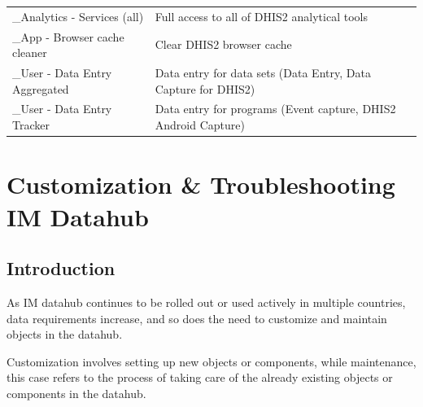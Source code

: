\documentclass[]{book}
\begin{document}
\begin{longtable}[]{@{}ll@{}}
\begin{minipage}[t]{0.27\columnwidth}\raggedright
\_Analytics - Services (all)\strut
\end{minipage} & \begin{minipage}[t]{0.67\columnwidth}\raggedright
Full access to all of DHIS2 analytical tools\strut
\end{minipage}\tabularnewline
\begin{minipage}[t]{0.27\columnwidth}\raggedright
\_App - Browser cache cleaner\strut
\end{minipage} & \begin{minipage}[t]{0.67\columnwidth}\raggedright
Clear DHIS2 browser cache\strut
\end{minipage}\tabularnewline
\begin{minipage}[t]{0.27\columnwidth}\raggedright
\_User - Data Entry Aggregated\strut
\end{minipage} & \begin{minipage}[t]{0.67\columnwidth}\raggedright
Data entry for data sets (Data Entry, Data Capture for DHIS2)\strut
\end{minipage}\tabularnewline
\begin{minipage}[t]{0.27\columnwidth}\raggedright
\_User - Data Entry Tracker\strut
\end{minipage} & \begin{minipage}[t]{0.67\columnwidth}\raggedright
Data entry for programs (Event capture, DHIS2 Android Capture)\strut
\end{minipage}\tabularnewline
\bottomrule
\end{longtable}

\hypertarget{custom}{%
\chapter{Customization \& Troubleshooting IM Datahub}\label{custom}}

\hypertarget{introduction-4}{%
\section{Introduction}\label{introduction-4}}

As IM datahub continues to be rolled out or used actively in multiple countries, data requirements increase, and so does the need to customize and maintain objects in the datahub.

Customization involves setting up new objects or components, while maintenance, this case refers to the process of taking care of the already existing objects or components in the datahub.
\end{document}
